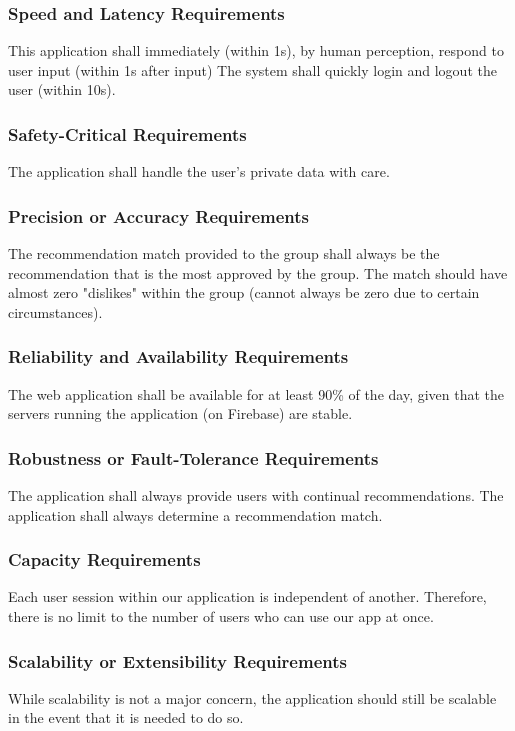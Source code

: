 \documentclass[12pt]{article}
\begin{document}
\subsubsection{Speed and Latency Requirements}
This application shall immediately (within 1s), by human perception, respond to user input (within 1s after input) The system shall quickly login and logout the user (within 10s).

\subsubsection{Safety-Critical Requirements}
The application shall handle the user's private data with care. 

\subsubsection{Precision or Accuracy Requirements}
The recommendation match provided to the group shall always be the recommendation that is the most approved by the group. The match should have almost zero "dislikes" within the group (cannot always be zero due to certain circumstances). 

\subsubsection{Reliability and Availability Requirements}
The web application shall be available for at least 90\% of the day, given that the servers running the application (on Firebase) are stable.

\subsubsection{Robustness or Fault-Tolerance Requirements}
The application shall always provide users with continual recommendations. The application shall always determine a recommendation match.

\subsubsection{Capacity Requirements}
Each user session within our application is independent of another. Therefore, there is no limit to the number of users who can use our app at once.

\subsubsection{Scalability or Extensibility Requirements}
While scalability is not a major concern, the application should still be scalable in the event that it is needed to do so. 
\end{document}
